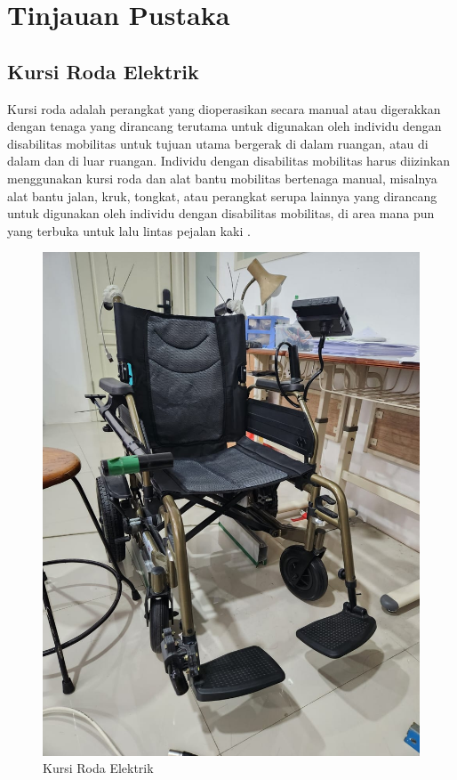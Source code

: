 \section{Tinjauan Pustaka}
\label{sec:tinjauanpustaka}

\subsection{Kursi Roda Elektrik}
Kursi roda adalah perangkat yang dioperasikan secara manual atau digerakkan dengan tenaga yang dirancang terutama untuk digunakan oleh individu dengan disabilitas mobilitas untuk tujuan utama bergerak di dalam ruangan, atau di dalam dan di luar ruangan.  Individu dengan disabilitas mobilitas harus diizinkan menggunakan kursi roda dan alat bantu mobilitas bertenaga manual, misalnya alat bantu jalan, kruk, tongkat, atau perangkat serupa lainnya yang dirancang untuk digunakan oleh individu dengan disabilitas mobilitas, di area mana pun yang terbuka untuk lalu lintas pejalan kaki \cite{ADA_2023}.

\begin{figure}[ht]
  \centering

  \includegraphics[scale=0.1]{gambar/bab3/kursi.jpeg}

  \caption{Kursi Roda Elektrik}
  \label{fig:kursiroda}
\end{figure}


